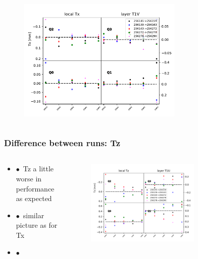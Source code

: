 \documentclass[aspectratio=1610, 12pt]{beamer}
\begin{document}
\begin{frame}
\begin{columns}
\begin{column}[c]{0.48\textwidth}
\begin{figure}
          \includegraphics[width=0.7\textwidth]{plots/stability_plots/diff_reduced_Tx_T1V_Tx.pdf}
        \end{figure}
      \end{column}
  \end{columns}
\end{frame}

\begin{frame}\frametitle{Difference between runs: Tz}
  \begin{columns}
    \begin{column}[c]{0.48\textwidth}
      \begin{itemize}
        \item $\bullet$\, Tz a little worse in performance as expected
        \item $\bullet$\, similar picture as for Tx
        \item $\bullet$\, 
      \end{itemize}  
    \end{column}
    \begin{column}[c]{0.48\textwidth}
      \begin{figure}
        \includegraphics[width=0.7\textwidth]{plots/stability_plots/diff_reduced_Tz_T1U_Tz.pdf}
      \end{figure}
    \end{column}
  \end{columns}
\end{frame}
\end{document}
